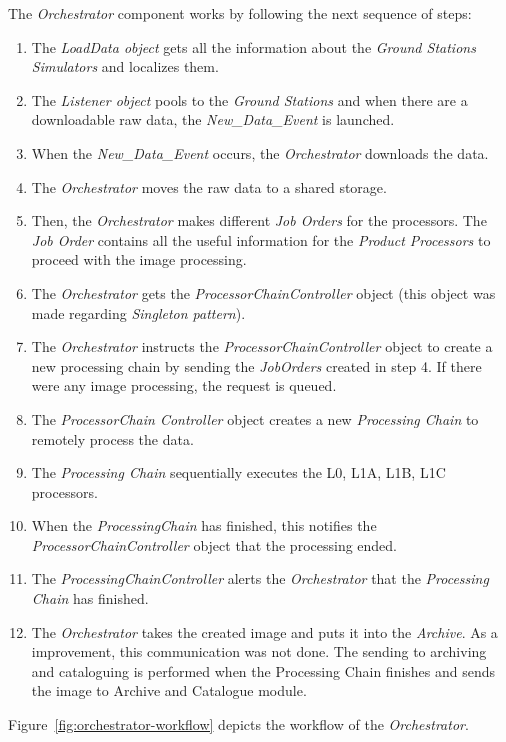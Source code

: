 The \emph{Orchestrator} component works by following the next sequence of steps:
\begin{enumerate}
\item The \emph{LoadData object} gets all the information about the \emph{Ground
    Stations Simulators} and localizes them.
\item The \emph{Listener object} pools to the \emph{Ground Stations} and when there are
  a downloadable raw data, the \emph{New\_Data\_Event} is launched.
\item  When the \emph{New\_Data\_Event} occurs, the \emph{Orchestrator} downloads the data.
\item  The \emph{Orchestrator} moves the raw data to a shared storage.
\item Then, the \emph{Orchestrator} makes different \emph{Job Orders} for the processors. The \emph{Job Order} contains all the useful information for the \emph{Product Processors} to proceed with the image processing.
\item The \emph{Orchestrator} gets the \emph{ProcessorChainController} object (this object was made regarding \emph{Singleton pattern}).
\item The \emph{Orchestrator} instructs the \emph{ProcessorChainController}
  object to create a new processing chain by sending the \emph{JobOrders}
  created in step 4. If there were any image processing, the request is queued.
\item The \emph{ProcessorChain Controller} object creates a new \emph{Processing
  Chain} to remotely process the data.
\item The \emph{Processing Chain} sequentially executes the L0, L1A, L1B, L1C processors.
\item When the \emph{ProcessingChain} has finished, this notifies the \emph{ProcessorChainController} object that the processing ended.
\item The \emph{ProcessingChainController} alerts the \emph{Orchestrator} that the \emph{Processing Chain} has finished.
\item The \emph{Orchestrator} takes the created image and puts it into the
  \emph{Archive}. As a improvement, this communication was not done. The
  sending to archiving and cataloguing is performed when the Processing Chain
  finishes and sends the image to Archive and Catalogue module. 
\end{enumerate}

Figure~\ref{fig:orchestrator-workflow} depicts the workflow of the \emph{Orchestrator}.

